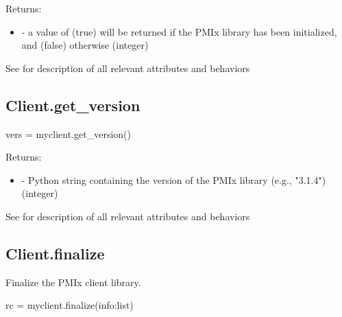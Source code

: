 Returns:

\begin{itemize}
    \item {} - a value of  (true) will be returned if the \ac{PMIx} library has been initialized, and  (false) otherwise (integer)

\end{itemize}


See  for description of all relevant attributes and behaviors

\subsection{Client.get_version}

\format

\pyspecificstart
\begin{codepar}
vers = myclient.get_version()
\end{codepar}
\pyspecificend



Returns:

\begin{itemize}
    \item {} - Python string containing the version of the \ac{PMIx} library (e.g., "3.1.4") (integer)

\end{itemize}


See  for description of all relevant attributes and behaviors

\subsection{Client.finalize}

\summary

Finalize the PMIx client library.

\format

\pyspecificstart
\begin{codepar}
rc = myclient.finalize(info:list)
\end{codepar}
\pyspecificend

\begin{arglist}
\end{arglist}

